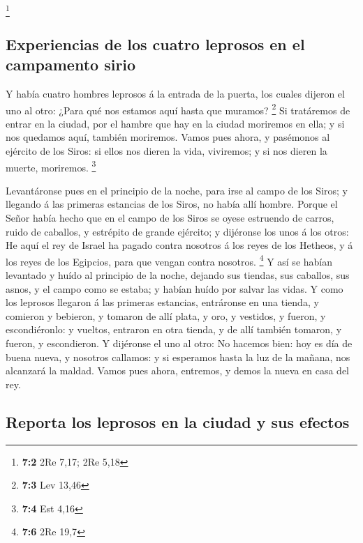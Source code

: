 \footnote{\textbf{7:2} 2Re 7,17; 2Re 5,18}

\hypertarget{experiencias-de-los-cuatro-leprosos-en-el-campamento-sirio}{%
\subsection{Experiencias de los cuatro leprosos en el campamento
sirio}\label{experiencias-de-los-cuatro-leprosos-en-el-campamento-sirio}}

 Y había cuatro hombres leprosos á la entrada de la puerta,
los cuales dijeron el uno al otro: ¿Para qué nos estamos aquí hasta que
muramos? \footnote{\textbf{7:3} Lev 13,46}  Si tratáremos de
entrar en la ciudad, por el hambre que hay en la ciudad moriremos en
ella; y si nos quedamos aquí, también moriremos. Vamos pues ahora, y
pasémonos al ejército de los Siros: si ellos nos dieren la vida,
viviremos; y si nos dieren la muerte, moriremos. \footnote{\textbf{7:4}
  Est 4,16}

 Levantáronse pues en el principio de la noche, para irse al
campo de los Siros; y llegando á las primeras estancias de los Siros, no
había allí hombre.  Porque el Señor había hecho que en el
campo de los Siros se oyese estruendo de carros, ruido de caballos, y
estrépito de grande ejército; y dijéronse los unos á los otros: He aquí
el rey de Israel ha pagado contra nosotros á los reyes de los Hetheos, y
á los reyes de los Egipcios, para que vengan contra nosotros.
\footnote{\textbf{7:6} 2Re 19,7}  Y así se habían levantado
y huído al principio de la noche, dejando sus tiendas, sus caballos, sus
asnos, y el campo como se estaba; y habían huído por salvar las vidas.
 Y como los leprosos llegaron á las primeras estancias,
entráronse en una tienda, y comieron y bebieron, y tomaron de allí
plata, y oro, y vestidos, y fueron, y escondiéronlo: y vueltos, entraron
en otra tienda, y de allí también tomaron, y fueron, y escondieron.
 Y dijéronse el uno al otro: No hacemos bien: hoy es día de
buena nueva, y nosotros callamos: y si esperamos hasta la luz de la
mañana, nos alcanzará la maldad. Vamos pues ahora, entremos, y demos la
nueva en casa del rey.

\hypertarget{reporta-los-leprosos-en-la-ciudad-y-sus-efectos}{%
\subsection{Reporta los leprosos en la ciudad y sus
efectos}\label{reporta-los-leprosos-en-la-ciudad-y-sus-efectos}}

